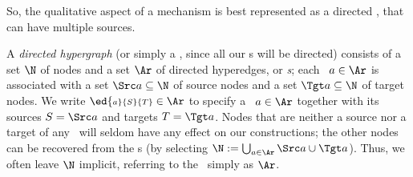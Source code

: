 So, the qualitative aspect of a mechanism is best represented as a directed \emph{\hyperarc}
\citep{gallo-dirhypergraphs1993}
\unskip, that can have multiple sources.
\begin{defn}
    A \emph{directed hypergraph}
    (or simply a {\hgraph}, since all our \hgraph s will be directed)
    consists of a set $\N$ of nodes
    and a set $\Ar$ of 
    directed hyperedges, or \emph{\hyperarc s};
    each \hyperarc\  $a \in \Ar$ is associated with
        a set $\Src a \subseteq \N$ of
    source nodes and a set $\Tgt a \subseteq \N$ of target nodes.    %
    We write $\ed {\scriptstyle a}{S}{T} \in \Ar$ to specify a
    \arc\ $a \in \Ar$ together with its sources $S = \Src a$ and targets $T = \Tgt a$.
%
Nodes that are neither a source nor a target of any \hyperarc\ will
seldom have any effect on our constructions; the other nodes can
be recovered from the \hyperarc s (by selecting $\N := \bigcup_{a \in
    \Ar} \Src a \cup \Tgt a$). Thus, we often leave $\N$ implicit,
referring to the \hgraph\ simply as $\Ar$.
\end{defn}
